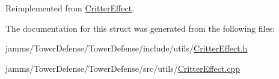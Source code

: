 Reimplemented from \hyperlink{class_critter_effect_aa66ba6502448706a5bc1608aa42e6847}{Critter\+Effect}.



The documentation for this struct was generated from the following files\+:\begin{DoxyCompactItemize}
\item 
jamms/\+Tower\+Defense/\+Tower\+Defense/include/utils/\hyperlink{_critter_effect_8h}{Critter\+Effect.\+h}\item 
jamms/\+Tower\+Defense/\+Tower\+Defense/src/utils/\hyperlink{_critter_effect_8cpp}{Critter\+Effect.\+cpp}\end{DoxyCompactItemize}

